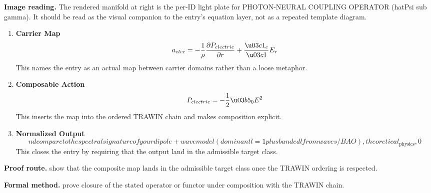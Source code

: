 \begin{samepage}
\noindent\begin{minipage}[t]{0.45\linewidth}
\vspace{0pt}
\raggedright
\scriptsize\textbf{Image reading.} The rendered manifold at right is the per-ID light plate for PHOTON-NEURAL COUPLING OPERATOR (hatPsi sub gamma). It should be read as the visual companion to the entry's equation layer, not as a repeated template diagram.\par
\end{minipage}\hfill
\begin{minipage}[t]{0.53\linewidth}
\vspace*{-0.10in}
\raggedright
{}
\end{minipage}
\end{samepage}

\clearpage


\begin{enumerate}[leftmargin=1.6em,itemsep=9pt,topsep=6pt]
\item \textbf{Carrier Map}
\[
a_{elec} = -\frac{1}{\rho}\frac{\partial P_{electric}}{\partial r} + \frac{\u03c1_e}{\u03c1}E_r
\]
This names the entry as an actual map between carrier domains rather than a loose metaphor.

\item \textbf{Composable Action}
\[
P_{electric} = -\frac{1}{2} \u03b5_0 E^2
\]
This inserts the map into the ordered TRAWIN chain and makes composition explicit.

\item \textbf{Normalized Output}
\[
nd compare to the spectral signature of your dipole+wave model (dominant l=1 plus banded l from waves/BAO),theoretical_{\mathrm{physics}},0
\]
This closes the entry by requiring that the output land in the admissible target class.
\end{enumerate}

\textbf{Proof route.} show that the composite map lands in the admissible target class once the TRAWIN ordering is respected.

\textbf{Formal method.} prove closure of the stated operator or functor under composition with the TRAWIN chain.

\medskip
{}

